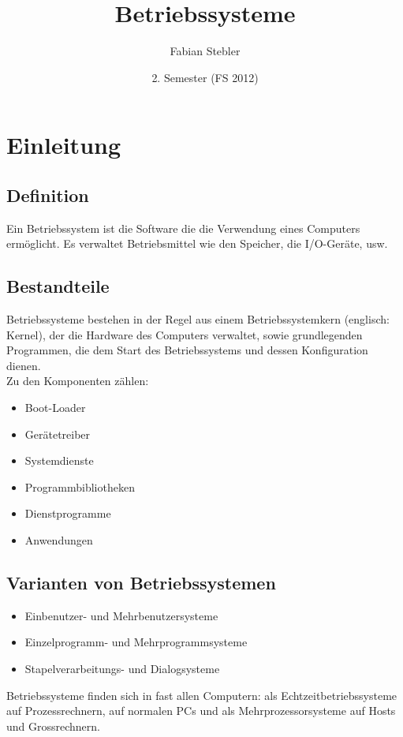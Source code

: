 \documentclass[a4paper, 10pt]{article}
\title{Betriebssysteme}
\author{Fabian Stebler}
\date{2. Semester (FS 2012)}
\begin{document}
\maketitle
\newpage
\thispagestyle{fancy} %

\section{Einleitung}
\subsection{Definition}
Ein Betriebssystem ist die Software die die Verwendung eines Computers ermöglicht. Es verwaltet Betriebsmittel wie den Speicher, die I/O-Geräte, usw.\\
\subsection{Bestandteile}
Betriebssysteme bestehen in der Regel aus einem Betriebssystemkern (englisch: Kernel), der die Hardware des Computers verwaltet, sowie grundlegenden Programmen, die dem Start des Betriebssystems und dessen Konfiguration dienen.\\
Zu den Komponenten zählen:
\begin{itemize}
\item Boot-Loader 
\item Gerätetreiber
\item Systemdienste
\item Programmbibliotheken
\item Dienstprogramme
\item Anwendungen
\end{itemize}

\subsection{Varianten von Betriebssystemen}
\begin{itemize}
\item Einbenutzer- und Mehrbenutzersysteme
\item Einzelprogramm- und Mehrprogrammsysteme 
\item Stapelverarbeitungs- und Dialogsysteme
\end{itemize}
Betriebssysteme finden sich in fast allen Computern: als Echtzeitbetriebssysteme auf Prozessrechnern, auf normalen PCs und als Mehrprozessorsysteme auf Hosts und Grossrechnern.
\end{document}
